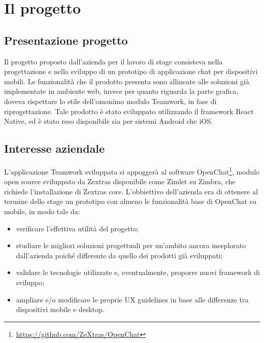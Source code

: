 
\chapter{Il progetto}\label{chap:project}
\section{Presentazione progetto}
Il progetto proposto dall'azienda per il lavoro di stage consisteva nella progettazione e nello sviluppo di un prototipo di applicazione chat per dispositivi mobili. Le funzionalità che il prodotto presenta sono allineate alle soluzioni già implementate in ambiente web, invece per quanto riguarda la parte grafica, doveva rispettare lo stile dell'omonimo modulo Teamwork, in fase di riprogettazione. Tale prodotto è stato sviluppato utilizzando il framework React Native, ed è stato reso disponibile sia per sistemi Android che iOS.

\section{Interesse aziendale}
L'applicazione Teamwork sviluppata si appoggerà al software OpenChat\footnote{\url{https://github.com/ZeXtras/OpenChat}}, modulo open source sviluppato da Zextras disponibile come Zimlet su Zimbra, che richiede l'installazione di Zextras core.
L'obbiettivo dell'azienda era di ottenere al termine dello stage un prototipo con almeno le funzionalità base di OpenChat su mobile, in modo tale da:
\begin{itemize}
	\item verificare l'effettiva utilità del progetto;
	\item studiare le migliori soluzioni progettuali per un'ambito ancora inesplorato dall'azienda poiché differente da quello dei prodotti già sviluppati;
	\item validare le tecnologie utilizzate e, eventualmente, proporre nuovi framework di sviluppo;
	\item ampliare e/o modificare le proprie UX guidelines in base alle differenze tra dispositivi mobile e desktop.
\end{itemize}



